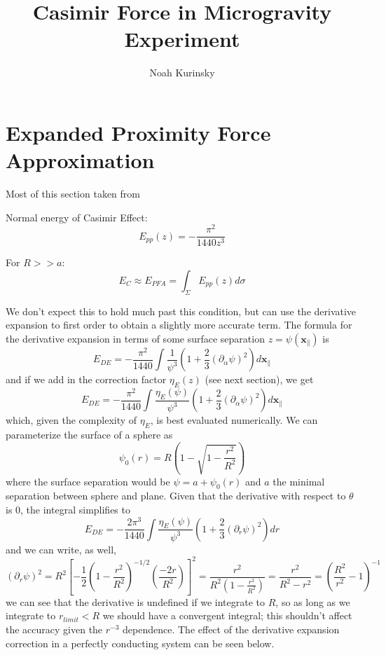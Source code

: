 \documentclass[11pt]{article}
\title{Casimir Force in Microgravity Experiment}
\author{Noah Kurinsky}
\begin{document}
\maketitle

\section{Expanded Proximity Force Approximation}
Most of this section taken from \citet{Dexp}

Normal energy of Casimir Effect:
$$
E_{pp}(z)=-\frac{\pi^2}{1440z^3}
$$

For $R>>a$:
$$
E_{C}\approx E_{PFA}=\int_{\Sigma}E_{pp}(z)d\sigma
$$

We don't expect this to hold much past this condition, but can use the derivative expansion to first order to obtain a slightly more accurate term. The formula for the derivative expansion in terms of some surface separation $z=\psi(\mathbf{x}_\parallel)$ is
$$
E_{DE}=-\frac{\pi^2}{1440}\int\frac{1}{\psi^3}\left(1+\frac{2}{3}(\partial_\alpha \psi)^2\right)d\mathbf{x}_\parallel
$$
and if we add in the correction factor $\eta_E(z)$ (see next section), we get
$$
E_{DE}=-\frac{\pi^2}{1440}\int\frac{\eta_E(\psi)}{\psi^3}\left(1+\frac{2}{3}(\partial_\alpha \psi)^2\right)d\mathbf{x}_\parallel
$$
which, given the complexity of $\eta_E$, is best evaluated numerically. We can parameterize the surface of a sphere as
$$
\psi_0(r)=R\left(1-\sqrt{1-\frac{r^2}{R^2}}\right)
$$
where the surface separation would be $\psi=a+\psi_0(r)$ and $a$ the minimal separation between sphere and plane. Given that the derivative with respect to $\theta$ is 0, the integral simplifies to
$$
E_{DE}=-\frac{2\pi^3}{1440}\int\frac{\eta_E(\psi)}{\psi^3}\left(1+\frac{2}{3}(\partial_r \psi)^2\right)dr
$$
and we can write, as well, 
$$
(\partial_r\psi)^2=R^2\left[-\frac{1}{2}\left(1-\frac{r^2}{R^2}\right)^{-1/2}\left(\frac{-2r}{R^2}\right)\right]^2=\frac{r^2}{R^2(1-\frac{r^2}{R^2})}=\frac{r^2}{R^2-r^2}=\left(\frac{R^2}{r^2}-1\right)^{-1}
$$
we can see that the derivative is undefined if we integrate to $R$, so as long as we integrate to $r_{limit}<R$ we should have a convergent integral; this shouldn't affect the accuracy given the $r^{-3}$ dependence. The effect of the derivative expansion correction in a perfectly conducting system can be seen below.
\end{document}
